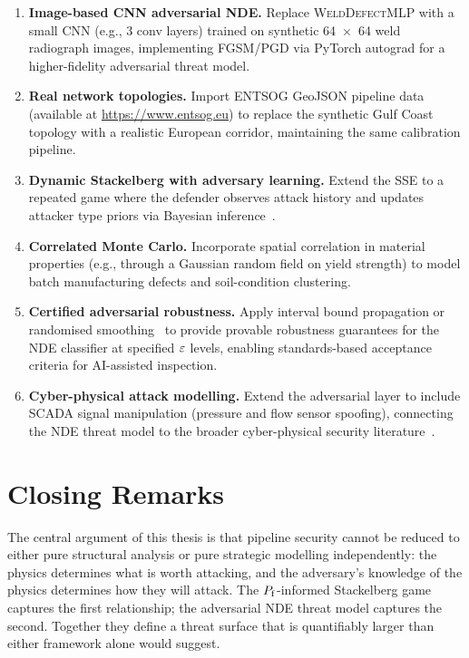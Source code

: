 \begin{enumerate}
  \item \textbf{Image-based CNN adversarial NDE.}  Replace
    \textsc{WeldDefectMLP} with a small CNN (e.g., 3 conv layers)
    trained on synthetic 64~$\times$~64 weld radiograph images,
    implementing FGSM/PGD via PyTorch autograd for a higher-fidelity
    adversarial threat model.

  \item \textbf{Real network topologies.}  Import ENTSOG GeoJSON
    pipeline data (available at \url{https://www.entsog.eu}) to
    replace the synthetic Gulf Coast topology with a realistic
    European corridor, maintaining the same calibration pipeline.

  \item \textbf{Dynamic Stackelberg with adversary learning.}  Extend
    the SSE to a repeated game where the defender observes attack
    history and updates attacker type priors via Bayesian
    inference~\cite{Zhu2013}.

  \item \textbf{Correlated Monte Carlo.}  Incorporate spatial
    correlation in material properties (e.g., through a
    Gaussian random field on yield strength) to model batch
    manufacturing defects and soil-condition clustering.

  \item \textbf{Certified adversarial robustness.}  Apply interval
    bound propagation or randomised smoothing~\cite{Carlini2017}
    to provide provable robustness guarantees for the NDE classifier
    at specified $\varepsilon$ levels, enabling standards-based acceptance
    criteria for AI-assisted inspection.

  \item \textbf{Cyber-physical attack modelling.}  Extend the
    adversarial layer to include SCADA signal manipulation (pressure
    and flow sensor spoofing), connecting the NDE threat model to
    the broader cyber-physical security literature~\cite{Mo2012}.
\end{enumerate}

\section{Closing Remarks}
\label{sec:conclusion_closing}

The central argument of this thesis is that pipeline security cannot
be reduced to either pure structural analysis or pure strategic modelling
independently: the physics determines what is worth attacking, and the
adversary's knowledge of the physics determines how they will attack.
The $P_{\mathrm{f}}$-informed Stackelberg game captures the first relationship;
the adversarial NDE threat model captures the second.  Together they
define a threat surface that is quantifiably larger than either
framework alone would suggest.

